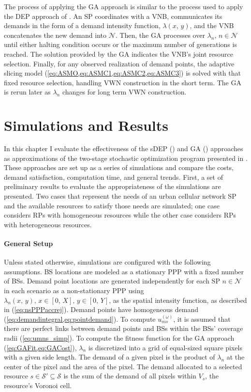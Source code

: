 \documentclass[12pt,dvipsnames]{report}
\begin{document}
The process of applying the GA approach is similar to the process used to apply the DEP approach of .  An SP coordinates with a VNB, communicates its demands in the form of a demand intensity function, $\lambda \left( x,\, y \right)$, and the VNB concatenates the new demand into $\mathcal{N}$.  Then, the GA processes over $\lambda_n,\, n \in \mathcal{N}$ until either halting condition occurs or the maximum number of generations is reached.  The solution provided by the GA indicates the VNB's joint resource selection.  Finally, for any observed realization of demand points, the adaptive slicing model (\cref{eq:ASMO,eq:ASMC1,eq:ASMC2,eq:ASMC3}) is solved with that fixed resource selection, handling VWN construction in the short term.  The GA is rerun later as $\lambda_n$ changes for long term VWN construction.
\fi

\iftrue
\pagebreak
\chapter{Simulations and Results} \label{ch:sim}

In this chapter I evaluate the effectiveness of the sDEP () and GA () approaches as approximations of the two-stage stochastic optimization program presented in .  These approaches are set up as a series of simulations and compare the costs, demand satisfaction, computation time, and general trends.  First, a set of preliminary results to evaluate the appropriateness of the simulations are presented.  Two cases that represent the needs of an urban cellular network SP and the available resources to satisfy those needs are simulated; one case considers RPs with homogeneous resources while the other case considers RPs with heterogeneous resources.

\subsubsection{General Setup}

Unless stated otherwise, simulations are configured with the following assumptions.  BS locations are modeled as a stationary PPP with a fixed number of BSs.  Demand point locations are generated independently for each SP $n \in \mathcal{N}$ in each scenario as a non-stationary PPP using $\lambda_n\left( x,\, y \right),\, x \in \left[ 0,\, X \right],\, y \in \left[ 0,\, Y \right]$, as the spatial intensity function, as described in  (\cref{eq:nsPPPaccrej}).  Demand points have homogeneous demand (\cref{eq:demandintegral,eq:pointdemand}).  To compute $u_{ms}^{\left( \omega \right)}$, it is assumed that there are perfect links between demand points and BSs within the BSs' coverage radii (\cref{eq:umns_simp}).  To compute the fitness function for the GA approach (\cref{eq:GAFit,eq:GACost}), $\lambda_n$ is discretized into a grid of equal-sized square pixels with a given side length.  The demand of a given pixel is the product of $\lambda_n$ at the center of the pixel and the area of the pixel.  The demand allocated to a selected resource $s \in \mathcal{S}' \subseteq \mathcal{S}$ is the sum of the demand of all pixels within $V_s$, the resource's Voronoi cell.
\end{document}
